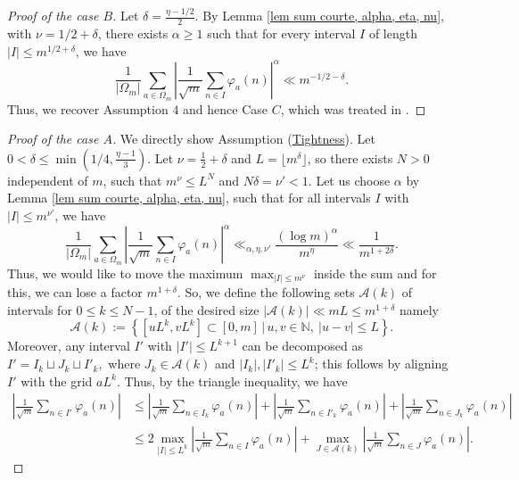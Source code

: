 \documentclass[12pt]{amsart}
\theoremstyle{definition}
\numberwithin{equation}{section}
\numberwithin{equation}{section}
\def\A{\mathcal{A}}
\begin{document}
\begin{proof}[Proof of the case $B$]
Let $\delta = \frac{\eta-1/2}{2}$. By Lemma \ref{lem sum courte, alpha, eta, nu}, with $\nu = 1/2+\delta$, there exists $\alpha\geq 1$ such that for every interval $I$ of length 
$|I|\leq m^{1/2 +\delta}$, we have
\[
\frac{1}{|\Omega_m|}\sum_{a\in \Omega_m} 
\left|
\frac{1}{\sqrt{m}}\sum_{n\in I} \varphi_a(n)\right|^\alpha 
\ll m^{-1/2-\delta}.
\]
Thus, we recover Assumption $4$ and hence Case \(C\), which was treated in \cite[Lemma 3.1]{ABL21}.
\end{proof}

\begin{proof}[Proof of the case $A$]
We directly show Assumption (\hyperlink{Ass Tightness}{Tightness}). Let $ 0<\delta \leq \min(1/4, \frac{\eta-1}{3})$.
Let $ \nu = \frac{1}{2}+\delta$ and $L = \lfloor  m^\delta \rfloor$, so there exists $N>0$ independent of $m$, such that $m^\nu\leq L^{N}$ and $N\delta = \nu' <1.$ Let us choose $\alpha$ by Lemma \ref{lem sum courte, alpha, eta, nu}, such that 
for all intervals $I$ with $|I|\leq m^{\nu'}$, we have
\begin{equation}\label{eq leq m (1+2delta)}
\frac{1}{|\Omega_m|}\sum_{a\in \Omega_m} \left|
\frac{1}{\sqrt{m}}\sum_{n\in I} \varphi_a(n)\right|^\alpha \ll_{\alpha, \eta,\nu'} \frac{(\log m)^\alpha}{m^\eta} \ll \frac{1}{m^{1+2\delta}}.
\end{equation}
Thus, we would like to move the maximum $\max_{|I|\leq m^{\nu}}$ inside the sum and for this, we can lose a factor $m^{1+\delta}$. So, we define the following sets $\A(k)$ of intervals for $0\leq k\leq N-1$, of the desired size $ |\A(k)| \ll m L \leq m^{1+\delta}$ namely
\[
\A(k):= \left\{ [uL^k ,vL^k] \subset [0, m] \,\Big|\, u,v\in\mathbb{N},\ |u-v|\leq L \right\}.
\]
Moreover, any interval \(I'\) with \(|I'|\leq L^{k+1}\) can be decomposed as
$
I' = I_k \sqcup J_k \sqcup I'_k,
$
where \(J_k\in \A(k)\) and \(|I_k|, |I'_k|\leq L^k\); this follows by aligning \(I'\) with the grid \(aL^k\). Thus, by the triangle inequality, we have
\begin{align*}
\left|\frac{1}{\sqrt{m}}\sum_{n\in I'} \varphi_a(n)\right|
&\leq 
\left|
\frac{1}{\sqrt{m}}\sum_{n\in I_k} \varphi_a(n)\right|
+ \left|
\frac{1}{\sqrt{m}}\sum_{n\in I'_k} \varphi_a(n)\right|
+ \left|\frac{1}{\sqrt{m}}\sum_{n\in J_k} \varphi_a(n)\right|\\
&\leq 
2\max_{|I|\leq L^k}
\left|
\frac{1}{\sqrt{m}}\sum_{n\in I} \varphi_a(n)\right|
+ \max_{J\in \A(k)}
\left|\frac{1}{\sqrt{m}}\sum_{n\in J} \varphi_a(n)\right|.
\end{align*}

\end{proof}
\end{document}
